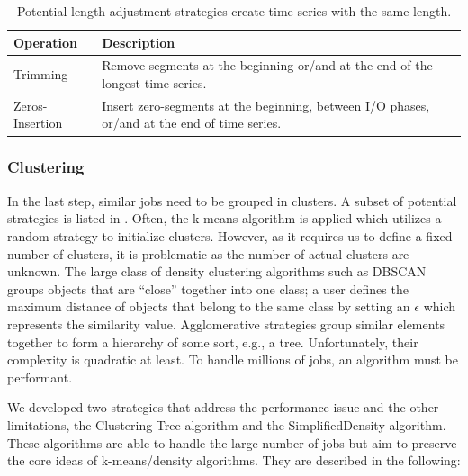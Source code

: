 \documentclass{jhps}
\begin{document}
\begin{table}
  \centering
    \begin{tabularx}{\textwidth}{lX}
      Operation       & Description                                                                                  \\
      \midrule
      Trimming        & Remove segments at the beginning or/and at the end of the longest time series. \\
      Zeros-Insertion & Insert zero-segments at the beginning, between I/O phases, or/and at the end of time series. \\
    \end{tabularx}
    \caption{Potential length adjustment strategies create time series with the same length.}
  \label{tab:matching_strategies}
\end{table}

\subsubsection{Clustering}
In the last step, similar jobs need to be grouped in clusters.
A subset of potential strategies is listed in .
Often, the k-means algorithm is applied which utilizes a random strategy to initialize clusters.
However, as it requires us to define a fixed number of clusters, it is problematic as the number of actual clusters are unknown.
The large class of density clustering algorithms such as DBSCAN groups objects that are “close” together into one class; a user defines the maximum distance of objects that belong to the same class by setting an $\epsilon$ which represents the similarity value.
Agglomerative strategies group similar elements together to form a hierarchy of some sort, e.g., a tree.
Unfortunately, their complexity is quadratic at least.
To handle millions of jobs, an algorithm must be performant.

We developed two strategies that address the performance issue and the other limitations, the Clustering-Tree algorithm and the SimplifiedDensity algorithm.
These algorithms are able to handle the large number of jobs but aim to preserve the core ideas of k-means/density algorithms.
They are described in the following:
\end{document}
